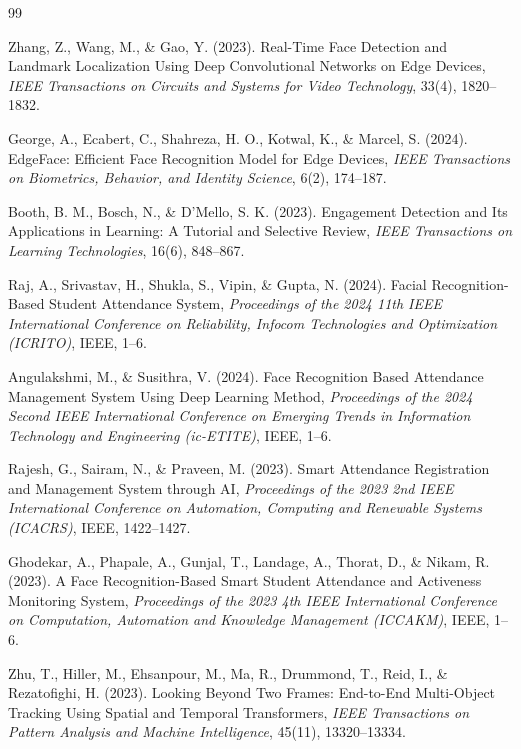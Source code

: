 \documentclass[10pt]{report}
\begin{document}
\begin{thebibliography}{99}


 Zhang, Z., Wang, M., \& Gao, Y. (2023). Real-Time Face Detection and Landmark Localization Using Deep Convolutional Networks on Edge Devices, \textit{IEEE Transactions on Circuits and Systems for Video Technology}, 33(4), 1820--1832.

 George, A., Ecabert, C., Shahreza, H. O., Kotwal, K., \& Marcel, S. (2024). EdgeFace: Efficient Face Recognition Model for Edge Devices, \textit{IEEE Transactions on Biometrics, Behavior, and Identity Science}, 6(2), 174--187.

 Booth, B. M., Bosch, N., \& D'Mello, S. K. (2023). Engagement Detection and Its Applications in Learning: A Tutorial and Selective Review, \textit{IEEE Transactions on Learning Technologies}, 16(6), 848--867.

 Raj, A., Srivastav, H., Shukla, S., Vipin, \& Gupta, N. (2024). Facial Recognition-Based Student Attendance System, \textit{Proceedings of the 2024 11th IEEE International Conference on Reliability, Infocom Technologies and Optimization (ICRITO)}, IEEE, 1--6.

 Angulakshmi, M., \& Susithra, V. (2024). Face Recognition Based Attendance Management System Using Deep Learning Method, \textit{Proceedings of the 2024 Second IEEE International Conference on Emerging Trends in Information Technology and Engineering (ic-ETITE)}, IEEE, 1--6.

 Rajesh, G., Sairam, N., \& Praveen, M. (2023). Smart Attendance Registration and Management System through AI, \textit{Proceedings of the 2023 2nd IEEE International Conference on Automation, Computing and Renewable Systems (ICACRS)}, IEEE, 1422--1427.

 Ghodekar, A., Phapale, A., Gunjal, T., Landage, A., Thorat, D., \& Nikam, R. (2023). A Face Recognition-Based Smart Student Attendance and Activeness Monitoring System, \textit{Proceedings of the 2023 4th IEEE International Conference on Computation, Automation and Knowledge Management (ICCAKM)}, IEEE, 1--6.

 Zhu, T., Hiller, M., Ehsanpour, M., Ma, R., Drummond, T., Reid, I., \& Rezatofighi, H. (2023). Looking Beyond Two Frames: End-to-End Multi-Object Tracking Using Spatial and Temporal Transformers, \textit{IEEE Transactions on Pattern Analysis and Machine Intelligence}, 45(11), 13320--13334.


\end{thebibliography}
\end{document}
